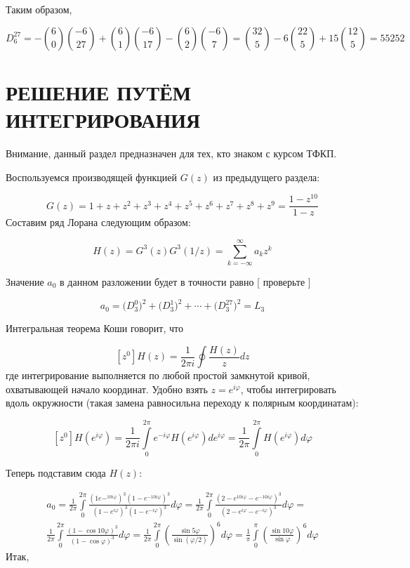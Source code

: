 \documentclass[12pt, letterpaper]{extarticle}
\begin{document}
Таким образом,

\[
  D_6^{27}=
  -\binom{6}{0}\binom{-6}{27}+\binom{6}{1}\binom{-6}{17}-\binom{6}{2}\binom{-6}{7}=\binom{32}{5}-6\binom{22}{5}+15\binom{12}{5}=55252
\]

\section{РЕШЕНИЕ ПУТЁМ ИНТЕГРИРОВАНИЯ}

Внимание, данный раздел предназначен для тех, кто знаком с курсом ТФКП.

Воспользуемся производящей функцией $G(z)$ из предыдущего раздела:

\[
G(z) = 1+z+z^2+z^3+z^4+z^5+z^6+z^7+z^8+z^9 = \frac{1-z^{10}}{1-z}
\]
Составим ряд Лорана следующим образом:

\[
  H(z)=G^3(z)G^3(1/z)=\sum_{k=-\infty}^{\infty}a_kz^k
\]

Значение $a_0$ в данном разложении будет в точности равно [ проверьте ]

\[
a_0=\bigl(D_3^0\bigr)^2+\bigl(D_3^1\bigr)^2+\cdots+\bigl(D_3^{27}\bigr)^2=L_3
\]

Интегральная теорема Коши говорит, что

\[
  [z^0]H(z) = \frac{1}{2\pi i} \oint \frac{H(z)}{z} dz
\]
где интегрирование выполняется по любой простой замкнутой кривой, охватывающей начало координат. Удобно взять $z=e^{i\varphi }$, чтобы интегрировать вдоль окружности (такая замена равносильна переходу к полярным координатам):

\[
  [z^0]H(e^{i\varphi })=
  \frac{1}{2\pi i}\int\limits_0^{2\pi}{e^{-i\varphi}H(e^{i\varphi})}de^{i\varphi}=
  \frac{1}{2\pi}\int\limits_0^{2\pi}{H(e^{i\varphi})}d\varphi
\]

Теперь подставим сюда $H(z)$:

\begin{gather*}
  a_0=
  \frac{1}{2\pi}\int\limits_0^{2\pi}{\frac{(1e-^{10i\varphi})^3(1-e^{-10i\varphi})^3}{(1-e^{i\varphi})^3(1-e^{-i\varphi})^3}}d\varphi=
  \frac{1}{2\pi}\int\limits_0^{2\pi}{\frac{(2-e^{10i\varphi}-e^{-10i\varphi})^3}{(2-e^{i\varphi}-e^{-i\varphi})^3}}d\varphi=\\
  \frac{1}{2\pi}\int\limits_0^{2\pi}{\frac{(1-\cos{10\varphi})^3}{(1-\cos{\varphi})^3}}d\varphi=
  \frac{1}{2\pi}\int\limits_0^{2\pi}{\left(\frac{\sin{5\varphi}}{\sin{(\varphi/2)}}\right)^6}d\varphi=
  \frac{1}{\pi}\int\limits_0^{\pi}{\left(\frac{\sin{10\varphi}}{\sin{\varphi}}\right)^6}d\varphi
\end{gather*}
Итак,
\end{document}

